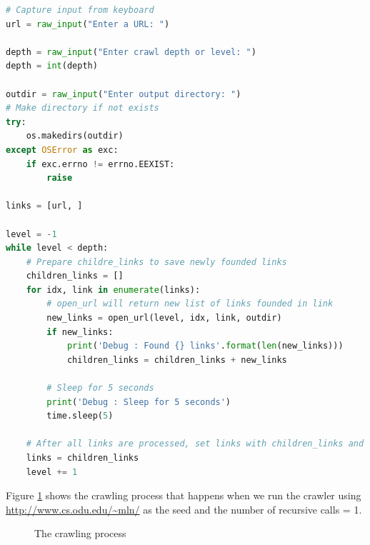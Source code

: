 \documentclass[letterpaper,11pt]{article}
\begin{document}
\begin{lstlisting}[language=python, caption={Simple single-threaded web crawler}, label={lst:web-crawler}]
# Capture input from keyboard
url = raw_input("Enter a URL: ")

depth = raw_input("Enter crawl depth or level: ")
depth = int(depth)

outdir = raw_input("Enter output directory: ")
# Make directory if not exists
try:
    os.makedirs(outdir)
except OSError as exc:
    if exc.errno != errno.EEXIST:
        raise

links = [url, ]

level = -1
while level < depth:
    # Prepare childre_links to save newly founded links
    children_links = []
    for idx, link in enumerate(links):
        # open_url will return new list of links founded in link
        new_links = open_url(level, idx, link, outdir)
        if new_links:
            print('Debug : Found {} links'.format(len(new_links)))
            children_links = children_links + new_links

        # Sleep for 5 seconds
        print('Debug : Sleep for 5 seconds')
        time.sleep(5)

    # After all links are processed, set links with children_links and increase level
    links = children_links
    level += 1


\end{lstlisting}

Figure \ref{fig:crawler} shows the crawling process that happens when we run the crawler using  \url{http://www.cs.odu.edu/~mln/} as the seed and the number of recursive calls = 1. 


\begin{figure}[H]


\centering

\caption{The crawling process}

\label{fig:crawler}

\end{figure} 
\end{document}

